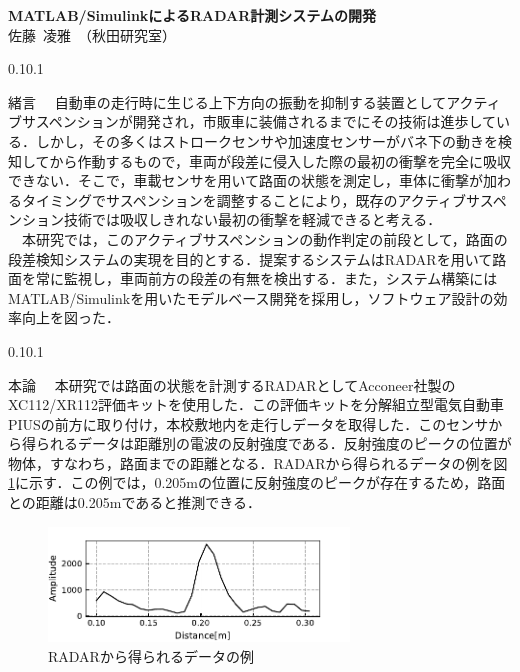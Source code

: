 \documentclass[autodetect-engine, dvipdfmx-if-dvi, ja=standard]{bxjsarticle}
\makeatletter
\renewcommand{\section}{%
    \@startsection{section}{1}{\z@}%
    {0.1\Cvs}{0.1\Cvs}%
    {\normalfont\large\headfont\raggedright}}
\makeatother
\begin{document}
\begin{center}
    \fontsize{14.053pt}{21.079pt}\selectfont
    {\bf MATLAB/SimulinkによるRADAR計測システムの開発}\\

    \fontsize{11.041pt}{16.562pt}\selectfont
    佐藤\ 凌雅\ （秋田研究室）
\end{center}


\begin{multicols}{2}
\fontsize{10.539pt}{15.809pt}\selectfont

\section{緒言}
　自動車の走行時に生じる上下方向の振動を抑制する装置としてアクティブサスペンションが開発され，市販車に装備されるまでにその技術は進歩している．しかし，その多くはストロークセンサや加速度センサーがバネ下の動きを検知してから作動するもので，車両が段差に侵入した際の最初の衝撃を完全に吸収できない．そこで，車載センサを用いて路面の状態を測定し，車体に衝撃が加わるタイミングでサスペンションを調整することにより，既存のアクティブサスペンション技術では吸収しきれない最初の衝撃を軽減できると考える．\\
　本研究では，このアクティブサスペンションの動作判定の前段として，路面の段差検知システムの実現を目的とする．提案するシステムはRADARを用いて路面を常に監視し，車両前方の段差の有無を検出する．また，システム構築にはMATLAB/Simulinkを用いたモデルベース開発を採用し，ソフトウェア設計の効率向上を図った．

\section{本論}
　本研究では路面の状態を計測するRADARとしてAcconeer社製のXC112/XR112評価キットを使用した．この評価キットを分解組立型電気自動車PIUSの前方に取り付け，本校敷地内を走行しデータを取得した．このセンサから得られるデータは距離別の電波の反射強度である．反射強度のピークの位置が物体，すなわち，路面までの距離となる．RADARから得られるデータの例を図\ref{fig:abst_demo}に示す．この例では，0.205mの位置に反射強度のピークが存在するため，路面との距離は0.205mであると推測できる．
\begin{figure}[H]
  \centering
  \includegraphics[width=8cm]{./fig/abst_demo.pdf}
  \caption{RADARから得られるデータの例}
  \label{fig:abst_demo}
\end{figure}


\end{multicols}
\end{document}
